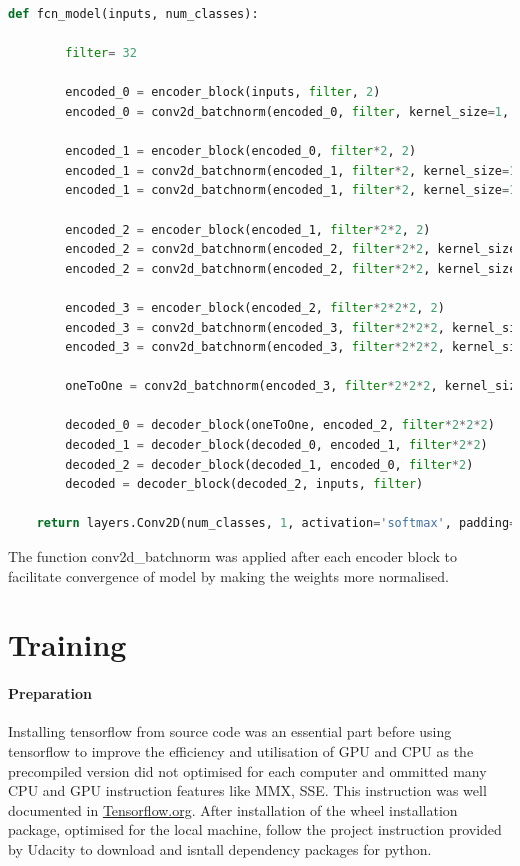 \documentclass[paper=a4, fontsize=11pt]{scrartcl} %
\numberwithin{equation}{section} %
\numberwithin{figure}{section} %
\numberwithin{table}{section} %
\begin{document}
\begin{lstlisting}[language=Python, caption=Fully convolutional network code]
	def fcn_model(inputs, num_classes):

		filter= 32
		
		encoded_0 = encoder_block(inputs, filter, 2)
		encoded_0 = conv2d_batchnorm(encoded_0, filter, kernel_size=1, strides=1)

		encoded_1 = encoder_block(encoded_0, filter*2, 2)
		encoded_1 = conv2d_batchnorm(encoded_1, filter*2, kernel_size=1, strides=1)
		encoded_1 = conv2d_batchnorm(encoded_1, filter*2, kernel_size=1, strides=1)

		encoded_2 = encoder_block(encoded_1, filter*2*2, 2)
		encoded_2 = conv2d_batchnorm(encoded_2, filter*2*2, kernel_size=1, strides=1)
		encoded_2 = conv2d_batchnorm(encoded_2, filter*2*2, kernel_size=1, strides=1)

		encoded_3 = encoder_block(encoded_2, filter*2*2*2, 2)
		encoded_3 = conv2d_batchnorm(encoded_3, filter*2*2*2, kernel_size=1, strides=1)
		encoded_3 = conv2d_batchnorm(encoded_3, filter*2*2*2, kernel_size=1, strides=1)

		oneToOne = conv2d_batchnorm(encoded_3, filter*2*2*2, kernel_size=1, strides=1)
		
		decoded_0 = decoder_block(oneToOne, encoded_2, filter*2*2*2)
		decoded_1 = decoder_block(decoded_0, encoded_1, filter*2*2)
		decoded_2 = decoder_block(decoded_1, encoded_0, filter*2)
		decoded = decoder_block(decoded_2, inputs, filter)
    
    return layers.Conv2D(num_classes, 1, activation='softmax', padding='same')(decoded)
\end{lstlisting}

The function conv2d\_batchnorm was applied after each encoder block to facilitate convergence of model by making the weights more normalised.

\pagebreak
\section{Training}

\paragraph{Preparation}
Installing tensorflow from source code was an essential part before using tensorflow to improve the efficiency and utilisation of GPU and CPU as the precompiled version did not optimised for each computer and ommitted many CPU and GPU instruction features like MMX, SSE\@. This instruction was well documented in \href{http://www.tensorflow.org/install/install_sources}{Tensorflow.org}. After installation of the wheel installation package, optimised for the local machine, follow the project instruction provided by Udacity to download and isntall dependency packages for python.
\end{document}

